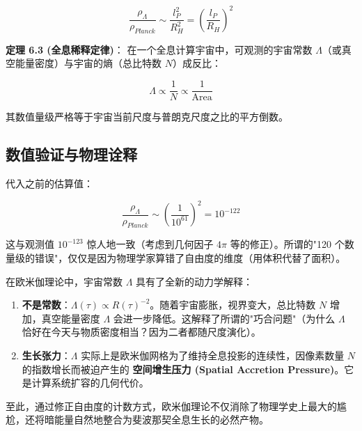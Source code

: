 \[\frac{\rho_{\Lambda}}{\rho_{Planck}} \sim \frac{l_P^2}{R_H^2} = \left( \frac{l_P}{R_H} \right)^2\]

\textbf{定理 6.3 (全息稀释定律)}：
在一个全息计算宇宙中，可观测的宇宙常数 $\Lambda$（或真空能量密度）与宇宙的熵（总比特数 $N$）成反比：

\[\Lambda \propto \frac{1}{N} \propto \frac{1}{\text{Area}}\]

其数值量级严格等于宇宙当前尺度与普朗克尺度之比的平方倒数。

\subsection{数值验证与物理诠释}

代入之前的估算值：

\[\frac{\rho_{\Lambda}}{\rho_{Planck}} \sim \left( \frac{1}{10^{61}} \right)^2 = 10^{-122}\]

这与观测值 $10^{-123}$ 惊人地一致（考虑到几何因子 $4\pi$ 等的修正）。所谓的"120 个数量级的错误"，仅仅是因为物理学家算错了自由度的维度（用体积代替了面积）。

在欧米伽理论中，宇宙常数 $\Lambda$ 具有了全新的动力学解释：

\begin{enumerate}
\item \textbf{不是常数}：$\Lambda(\tau) \propto R(\tau)^{-2}$。随着宇宙膨胀，视界变大，总比特数 $N$ 增加，真空能量密度 $\Lambda$ 会进一步降低。这解释了所谓的"巧合问题"（为什么 $\Lambda$ 恰好在今天与物质密度相当？因为二者都随尺度演化）。
\item \textbf{生长张力}：$\Lambda$ 实际上是欧米伽网格为了维持全息投影的连续性，因像素数量 $N$ 的指数增长而被迫产生的 \textbf{空间增生压力 (Spatial Accretion Pressure)}。它是计算系统扩容的几何代价。
\end{enumerate}

至此，通过修正自由度的计数方式，欧米伽理论不仅消除了物理学史上最大的尴尬，还将暗能量自然地整合为斐波那契全息生长的必然产物。
